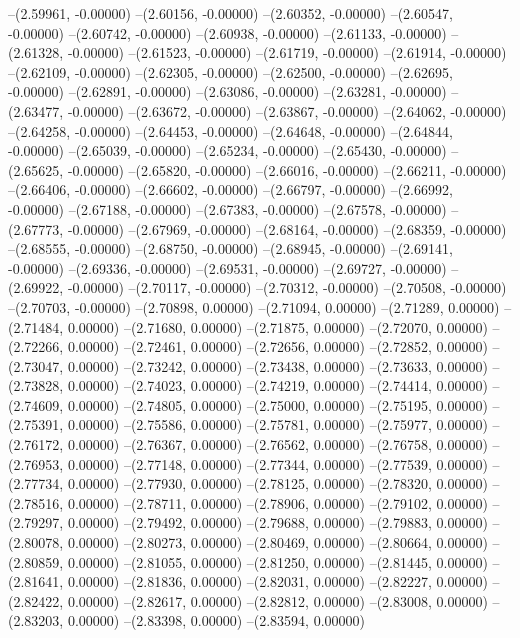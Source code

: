 --(2.59961, -0.00000)
--(2.60156, -0.00000)
--(2.60352, -0.00000)
--(2.60547, -0.00000)
--(2.60742, -0.00000)
--(2.60938, -0.00000)
--(2.61133, -0.00000)
--(2.61328, -0.00000)
--(2.61523, -0.00000)
--(2.61719, -0.00000)
--(2.61914, -0.00000)
--(2.62109, -0.00000)
--(2.62305, -0.00000)
--(2.62500, -0.00000)
--(2.62695, -0.00000)
--(2.62891, -0.00000)
--(2.63086, -0.00000)
--(2.63281, -0.00000)
--(2.63477, -0.00000)
--(2.63672, -0.00000)
--(2.63867, -0.00000)
--(2.64062, -0.00000)
--(2.64258, -0.00000)
--(2.64453, -0.00000)
--(2.64648, -0.00000)
--(2.64844, -0.00000)
--(2.65039, -0.00000)
--(2.65234, -0.00000)
--(2.65430, -0.00000)
--(2.65625, -0.00000)
--(2.65820, -0.00000)
--(2.66016, -0.00000)
--(2.66211, -0.00000)
--(2.66406, -0.00000)
--(2.66602, -0.00000)
--(2.66797, -0.00000)
--(2.66992, -0.00000)
--(2.67188, -0.00000)
--(2.67383, -0.00000)
--(2.67578, -0.00000)
--(2.67773, -0.00000)
--(2.67969, -0.00000)
--(2.68164, -0.00000)
--(2.68359, -0.00000)
--(2.68555, -0.00000)
--(2.68750, -0.00000)
--(2.68945, -0.00000)
--(2.69141, -0.00000)
--(2.69336, -0.00000)
--(2.69531, -0.00000)
--(2.69727, -0.00000)
--(2.69922, -0.00000)
--(2.70117, -0.00000)
--(2.70312, -0.00000)
--(2.70508, -0.00000)
--(2.70703, -0.00000)
--(2.70898, 0.00000)
--(2.71094, 0.00000)
--(2.71289, 0.00000)
--(2.71484, 0.00000)
--(2.71680, 0.00000)
--(2.71875, 0.00000)
--(2.72070, 0.00000)
--(2.72266, 0.00000)
--(2.72461, 0.00000)
--(2.72656, 0.00000)
--(2.72852, 0.00000)
--(2.73047, 0.00000)
--(2.73242, 0.00000)
--(2.73438, 0.00000)
--(2.73633, 0.00000)
--(2.73828, 0.00000)
--(2.74023, 0.00000)
--(2.74219, 0.00000)
--(2.74414, 0.00000)
--(2.74609, 0.00000)
--(2.74805, 0.00000)
--(2.75000, 0.00000)
--(2.75195, 0.00000)
--(2.75391, 0.00000)
--(2.75586, 0.00000)
--(2.75781, 0.00000)
--(2.75977, 0.00000)
--(2.76172, 0.00000)
--(2.76367, 0.00000)
--(2.76562, 0.00000)
--(2.76758, 0.00000)
--(2.76953, 0.00000)
--(2.77148, 0.00000)
--(2.77344, 0.00000)
--(2.77539, 0.00000)
--(2.77734, 0.00000)
--(2.77930, 0.00000)
--(2.78125, 0.00000)
--(2.78320, 0.00000)
--(2.78516, 0.00000)
--(2.78711, 0.00000)
--(2.78906, 0.00000)
--(2.79102, 0.00000)
--(2.79297, 0.00000)
--(2.79492, 0.00000)
--(2.79688, 0.00000)
--(2.79883, 0.00000)
--(2.80078, 0.00000)
--(2.80273, 0.00000)
--(2.80469, 0.00000)
--(2.80664, 0.00000)
--(2.80859, 0.00000)
--(2.81055, 0.00000)
--(2.81250, 0.00000)
--(2.81445, 0.00000)
--(2.81641, 0.00000)
--(2.81836, 0.00000)
--(2.82031, 0.00000)
--(2.82227, 0.00000)
--(2.82422, 0.00000)
--(2.82617, 0.00000)
--(2.82812, 0.00000)
--(2.83008, 0.00000)
--(2.83203, 0.00000)
--(2.83398, 0.00000)
--(2.83594, 0.00000)
